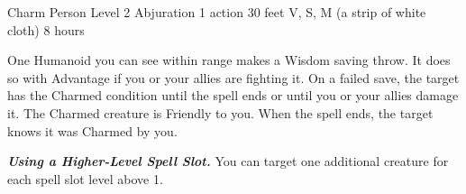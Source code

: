 \DndSpellHeader%
    {Charm Person}
    {Level 2 Abjuration}
    {1 action}
    {30 feet}
    {V, S, M (a strip of white cloth)}
    {8 hours}

One Humanoid you can see within range makes a Wisdom saving throw. It does so with Advantage if you or your allies are fighting it. On a failed save, the target has the Charmed condition until the spell ends or until you or your allies damage it. The Charmed creature is Friendly to you. When the spell ends, the target knows it was Charmed by you.

\textbf{\textit{Using a Higher-Level Spell Slot.}} You can target one additional creature for each spell slot level above 1.
